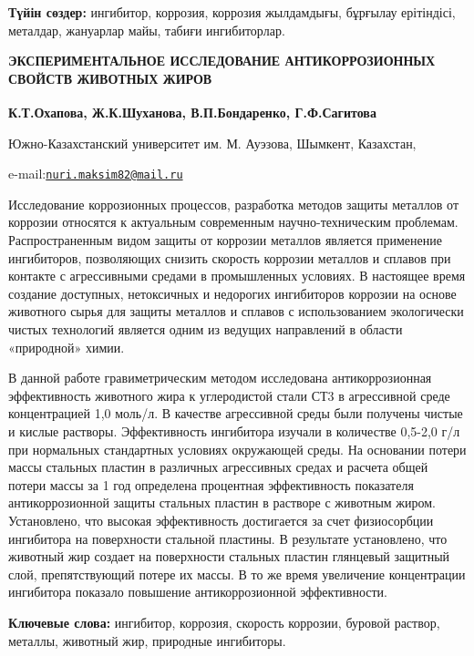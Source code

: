{\bfseries Түйін сөздер:} ингибитор, коррозия, коррозия жылдамдығы,
бұрғылау ерітіндісі, металдар, жануарлар майы, табиғи ингибиторлар.
\begin{articleheader}

{\bfseries ЭКСПЕРИМЕНТАЛЬНОЕ ИССЛЕДОВАНИЕ АНТИКОРРОЗИОННЫХ СВОЙСТВ ЖИВОТНЫХ ЖИРОВ}

{\bfseries К.Т.Охапова\textsuperscript{\envelope }, Ж.К.Шуханова, В.П.Бондаренко,
Г.Ф.Сагитова}
\end{articleheader}

\begin{affiliation}

Южно-Казахстанский университет им. М. Ауэзова, Шымкент, Казахстан,

e-mail:\href{mailto:nuri.maksim82@mail.ru}{\nolinkurl{nuri.maksim82@mail.ru}}
\end{affiliation}

Исследование коррозионных процессов, разработка методов защиты металлов
от коррозии относятся к актуальным современным научно-техническим
проблемам. Распространенным видом защиты от коррозии металлов является
применение ингибиторов, позволяющих снизить скорость коррозии металлов и
сплавов при контакте с агрессивными средами в промышленных условиях. В
настоящее время создание доступных, нетоксичных и недорогих ингибиторов
коррозии на основе животного сырья для защиты металлов и сплавов с
использованием экологически чистых технологий является одним из ведущих
направлений в области «природной» химии.

В данной работе гравиметрическим методом исследована антикоррозионная
эффективность животного жира к углеродистой стали СТ3 в агрессивной
среде концентрацией 1,0 моль/л. В качестве агрессивной среды были
получены чистые и кислые растворы. Эффективность ингибитора изучали в
количестве 0,5-2,0 г/л при нормальных стандартных условиях окружающей
среды. На основании потери массы стальных пластин в различных
агрессивных средах и расчета общей потери массы за 1 год определена
процентная эффективность показателя антикоррозионной защиты стальных
пластин в растворе с животным жиром. Установлено, что высокая
эффективность достигается за счет физиосорбции ингибитора на поверхности
стальной пластины. В результате установлено, что животный жир создает на
поверхности стальных пластин глянцевый защитный слой, препятствующий
потере их массы. В то же время увеличение концентрации ингибитора
показало повышение антикоррозионной эффективности.

{\bfseries Ключевые слова:} ингибитор, коррозия, скорость коррозии, буровой
раствор, металлы, животный жир, природные ингибиторы.

